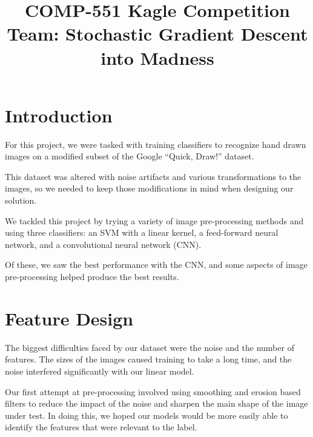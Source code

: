 \documentclass[conference]{IEEEtran}
\begin{document}
\title{COMP-551 Kagle Competition\\
{\Large Team: Stochastic Gradient Descent into Madness}
}

\author{
\and
{}
\and
{}
}

\maketitle

\section{Introduction}

For this project, we were tasked with training classifiers to recognize hand drawn images on a modified subset of the Google ``Quick, Draw!'' dataset.

This dataset was altered with noise artifacts and various transformations to the images, so we needed to keep those modifications in mind when designing our solution.

We tackled this project by trying a variety of image pre-processing methods and using three classifiers: an SVM with a linear kernel, a feed-forward neural network, and a convolutional neural network (CNN).

Of these, we saw the best performance with the CNN, and some aspects of image pre-processing helped produce the best results.

\section{Feature Design}

The biggest difficulties faced by our dataset were the noise and the number of features. The sizes of the images caused training to take a long time, and the noise interfered significantly with our linear model.

Our first attempt at pre-processing involved using smoothing and erosion based filters to reduce the impact of the noise and sharpen the main shape of the image under test. In doing this, we hoped our models would be more easily able to identify the features that were relevant to the label.
\end{document}
